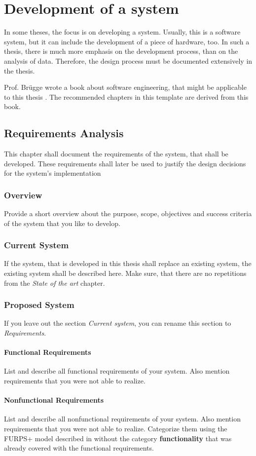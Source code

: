 \section{Development of a system}
In some theses, the focus is on developing a system.
Usually, this is a software system, but it can include the development of a piece of hardware, too.
In such a thesis, there is much more emphasis on the development process, than on the analysis of data.
Therefore, the design process must be documented extensively in the thesis.

Prof. Brügge wrote a book about software engineering, that might be applicable to this thesis \cite{bruegge2009object}.
The recommended chapters in this template are derived from this book.

\subsection{Requirements Analysis}
	This chapter shall document the requirements of the system, that shall be developed.
	These requirements shall later be used to justify the design decisions for the system's implementation

	\subsubsection{Overview}
		Provide a short overview about the purpose, scope, objectives and success criteria of the system that you like to develop.
	\subsubsection{Current System}
		If the system, that is developed in this thesis shall replace an existing system, the existing system shall be described here.
		Make sure, that there are no repetitions from the \textit{State of the art} chapter.
	\subsubsection{Proposed System}
		If you leave out the section \textit{Current system}, you can rename this section to \textit{Requirements}.
		\paragraph{Functional Requirements}
			List and describe all functional requirements of your system.
			Also mention requirements that you were not able to realize.
		\paragraph{Nonfunctional Requirements}
			List and describe all nonfunctional requirements of your system.
			Also mention requirements that you were not able to realize.
			Categorize them using the FURPS+ model described in \cite{bruegge2009object} without the category \textbf{functionality} that was already covered with the functional requirements.
